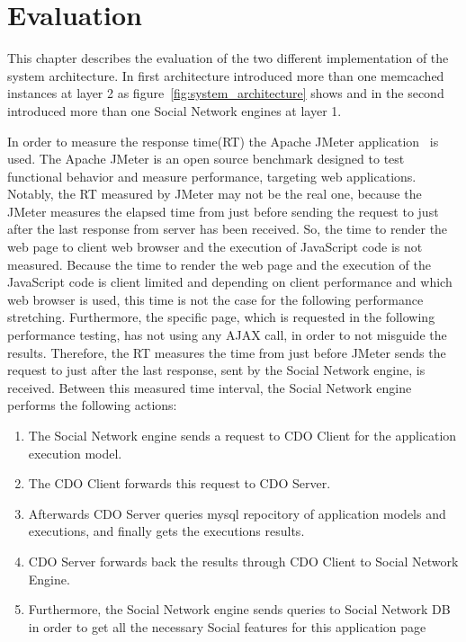 \chapter{Evaluation}
\label{chapt:evaluation}

This chapter describes the evaluation of the two different implementation of the system architecture. In first architecture introduced more than one memcached instances at layer 2 as figure~\ref{fig:system_architecture} shows and in the second introduced more than one Social Network engines at layer 1.

In order to measure the response time(RT) the Apache JMeter application~\cite{jmeter_url} is used. The Apache JMeter is an open source benchmark designed to test functional behavior and  measure performance, targeting web applications. Notably, the RT measured by JMeter may not be the real one, because the JMeter measures the elapsed time from just before sending the request to just after the last response from server has been received. So, the time to render the web page to client web browser and the execution of JavaScript code is not measured. Because the time to render the web page and the execution of the JavaScript code is client limited and depending on client performance and which web browser is used, this time is not the case for the following performance stretching. Furthermore, the specific page, which is requested in the following performance testing, has not using any AJAX call, in order to not misguide the results. Therefore, the RT measures the time from just before JMeter sends the request to just after the last response, sent by the Social Network engine, is received. Between this measured time interval, the Social Network engine performs the following actions:
\begin{enumerate}[I]
\item The Social Network engine sends a request to CDO Client for the application execution model.
\item \label{l:1} The CDO Client forwards this request to CDO Server.
\item Afterwards CDO Server queries mysql repocitory of application models and executions, and finally gets the executions results.
\item CDO Server forwards back the results through CDO Client to Social Network Engine.
\item Furthermore, the Social Network engine sends queries to Social Network DB in order to get all the necessary Social features for this application page
\end{enumerate}

